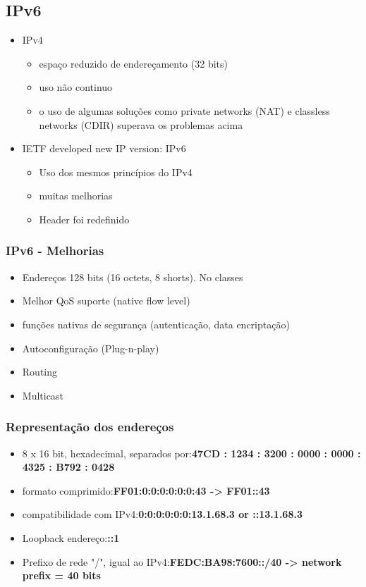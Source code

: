 \documentclass{article}
\begin{document}
\subsection{IPv6}
\begin{itemize}
    \item IPv4
    \begin{itemize}
        \item espaço reduzido de endereçamento (32 bits)
        \item uso não continuo
        \item o uso de algumas soluções como private networks (NAT) e classless networks (CDIR) superava os problemas acima
    \end{itemize}
    \item IETF developed new IP version: IPv6
    \begin{itemize}
        \item Uso dos mesmos princípios do IPv4
        \item muitas melhorias
        \item Header foi redefinido
    \end{itemize}
\end{itemize}

\subsubsection{IPv6 - Melhorias}
\begin{itemize}
    \item Endereços 128 bits (16 octets, 8 shorts). No classes
    \item Melhor QoS suporte (native flow level)
    \item funções nativas de segurança (autenticação, data encriptação)
    \item Autoconfiguração (Plug-n-play)
    \item Routing
    \item Multicast
\end{itemize}

\subsubsection{Representação dos endereços}
\begin{itemize}
    \item 8 x 16 bit, hexadecimal, separados por:\newline \textbf{47CD : 1234 : 3200 : 0000 : 0000 : 4325 : B792 : 0428}
    \item formato comprimido:\newline \textbf{FF01:0:0:0:0:0:0:43 -> FF01::43}
    \item compatibilidade com IPv4:\newline \textbf{0:0:0:0:0:0:13.1.68.3 or ::13.1.68.3}
    \item Loopback endereço:\newline \textbf{::1}
    \item Prefixo de rede "/", igual ao IPv4:\newline \textbf{FEDC:BA98:7600::/40 -> network prefix = 40 bits}
\end{itemize}
\end{document}
